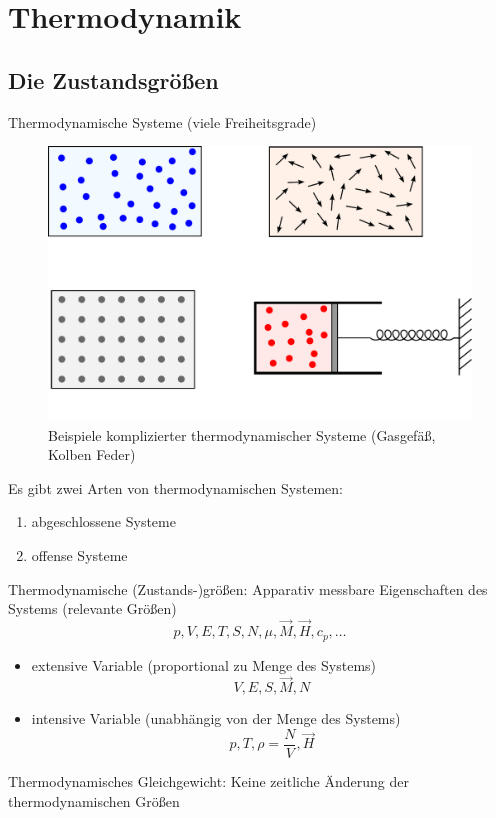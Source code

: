 \section{Thermodynamik}
\subsection{Die Zustandsgrößen}
Thermodynamische Systeme (viele Freiheitsgrade)
\begin{figure}[H]
    \begin{center}
        \includegraphics[width=\textwidth]{../img/exampleSystems.pdf}
        \caption{Beispiele komplizierter thermodynamischer Systeme (Gasgefäß, Kolben Feder)}
        \label{img:exampleSystems}
    \end{center}
\end{figure}
Es gibt zwei Arten von thermodynamischen Systemen:
\begin{enumerate}
    \item abgeschlossene Systeme
    \item offense Systeme
\end{enumerate}
Thermodynamische (Zustands-)größen:
Apparativ messbare Eigenschaften des Systems (relevante Größen)
\begin{equation}
    p, V, E, T, S, N, \mu, \vec{M}, \vec{H}, c_p, \ldots
\end{equation}
\begin{itemize}
    \item extensive Variable (proportional zu Menge des Systems)
    \begin{equation}
        V, E, S, \vec{M}, N
    \end{equation}
    \item intensive Variable (unabhängig von der Menge des Systems)
    \begin{equation}
        p, T, \rho=\frac{N}{V}, \vec{H}
    \end{equation}
\end{itemize}
Thermodynamisches Gleichgewicht: Keine zeitliche Änderung der thermodynamischen Größen
